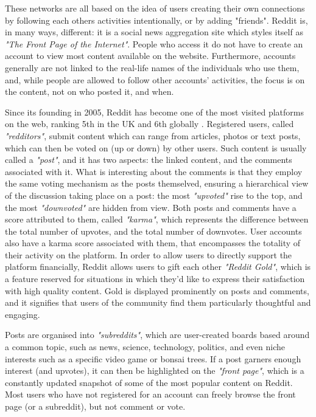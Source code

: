 \documentclass[bsc,frontabs,twoside,singlespacing,parskip,deptreport]{infthesis}
\begin{document}
These networks are all based on the idea of users creating their own connections by following each others activities intentionally, or by adding "friends". Reddit is, in many ways, different: it is a social news aggregation site which styles itself as \textit{"The Front Page of the Internet"}. People who access it do not have to create an account to view most content available on the website. Furthermore, accounts generally are not linked to the real-life names of the individuals who use them, and, while people are allowed to follow other accounts' activities, the focus is on the content, not on who posted it, and when. 

Since its founding in 2005, Reddit has become one of the most visited platforms on the web, ranking 5th in the UK and 6th globally \cite{alexa}. Registered users, called \textit{"redditors"}, submit content which can range from articles, photos or text posts, which can then be voted on (up or down) by other users. Such content is usually called a \textit{"post"}, and it has two aspects: the linked content, and the comments associated with it. What is interesting about the comments is that they employ the same voting mechanism as the posts themselved, ensuring a hierarchical view of the discussion taking place on a post: the most \textit{"upvoted"} rise to the top, and the most \textit{"downvoted"} are hidden from view. Both posts and comments have a score attributed to them, called \textit{"karma"}, which represents the difference between the total number of upvotes, and the total number of downvotes. User accounts also have a karma score associated with them, that encompasses the totality of their activity on the platform. In order to allow users to directly support the platform financially, Reddit allows users to gift each other \textit{"Reddit Gold"}, which is a feature reserved for situations in which they'd like to express their satisfaction with high quality content. Gold is displayed prominently on posts and comments, and it signifies that users of the community find them particularly thoughtful and engaging.

Posts are organised into \textit{"subreddits"}, which are user-created boards based around a common topic, such as news, science, technology, politics, and even niche interests such as a specific video game or bonsai trees. If a post garners enough interest (and upvotes), it can then be highlighted on the \textit{"front page"}, which is a constantly updated snapshot of some of the most popular content on Reddit. Most users who have not registered for an account can freely browse the front page (or a subreddit), but not comment or vote.
\end{document}
